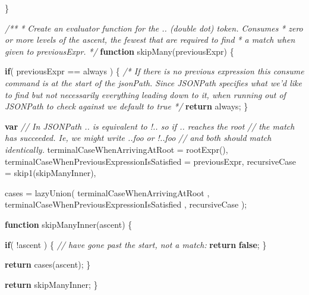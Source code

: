 \documentclass[]{article}
\newenvironment{Shaded}{}{}
\newcommand{\KeywordTok}[1]{\textcolor[rgb]{0.00,0.44,0.13}{\textbf{{#1}}}}
\newcommand{\CommentTok}[1]{\textcolor[rgb]{0.38,0.63,0.69}{\textit{{#1}}}}
\newcommand{\FunctionTok}[1]{\textcolor[rgb]{0.02,0.16,0.49}{{#1}}}
\newcommand{\NormalTok}[1]{{#1}}
\begin{document}
\begin{Shaded}
\begin{Highlighting}[]
   \NormalTok{\}   }
   
   \CommentTok{/**}
\CommentTok{    * Create an evaluator function for the .. (double dot) token. Consumes}
\CommentTok{    * zero or more levels of the ascent, the fewest that are required to find}
\CommentTok{    * a match when given to previousExpr.}
\CommentTok{    */}   
   \KeywordTok{function} \FunctionTok{skipMany}\NormalTok{(previousExpr) \{}

      \KeywordTok{if}\NormalTok{( previousExpr == always ) \{}
         \CommentTok{/* If there is no previous expression this consume command }
\CommentTok{            is at the start of the jsonPath.}
\CommentTok{            Since JSONPath specifies what we'd like to find but not }
\CommentTok{            necessarily everything leading down to it, when running}
\CommentTok{            out of JSONPath to check against we default to true */}            
         \KeywordTok{return} \NormalTok{always;}
      \NormalTok{\}}
          
      \KeywordTok{var} 
          \CommentTok{// In JSONPath .. is equivalent to !.. so if .. reaches the root}
          \CommentTok{// the match has succeeded. Ie, we might write ..foo or !..foo}
          \CommentTok{// and both should match identically.}
          \NormalTok{terminalCaseWhenArrivingAtRoot = }\FunctionTok{rootExpr}\NormalTok{(),}
          \NormalTok{terminalCaseWhenPreviousExpressionIsSatisfied = previousExpr, }
          \NormalTok{recursiveCase = }\FunctionTok{skip1}\NormalTok{(skipManyInner),}
          
          \NormalTok{cases = }\FunctionTok{lazyUnion}\NormalTok{(}
                     \NormalTok{terminalCaseWhenArrivingAtRoot}
                  \NormalTok{,  terminalCaseWhenPreviousExpressionIsSatisfied}
                  \NormalTok{,  recursiveCase}
                  \NormalTok{);                        }
            
      \KeywordTok{function} \FunctionTok{skipManyInner}\NormalTok{(ascent) \{}
      
         \KeywordTok{if}\NormalTok{( !ascent ) \{}
            \CommentTok{// have gone past the start, not a match:         }
            \KeywordTok{return} \KeywordTok{false}\NormalTok{;}
         \NormalTok{\}      }
                                                        
         \KeywordTok{return} \FunctionTok{cases}\NormalTok{(ascent);}
      \NormalTok{\}}
      
      \KeywordTok{return} \NormalTok{skipManyInner;}
   \NormalTok{\}      }
   

\end{Highlighting}
\end{Shaded}
\end{document}
